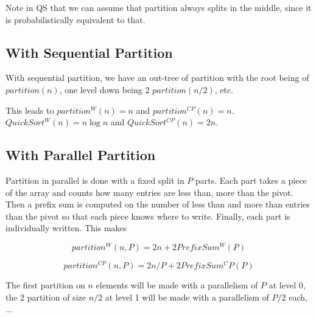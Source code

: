 \documentclass{article}
\begin{document}
Note in QS that we can assume that partition always splits in the
middle, since it is probabilistically equivalent to that.

\subsection{With Sequential Partition}

With sequential partition, we have an out-tree of partition with the
root being of $partition(n)$, one level down being 2 $partition(n/2)$,
etc.

This leads to $partition^W(n) = n$ and
$partition^{CP}(n)=n$. $QuickSort^W(n) = n \log n$ and
$QuickSort^{CP}(n) = 2n$.

\subsection{With Parallel Partition}

Partition in parallel is done with a fixed split in $P$ parts. Each
part takes a piece of the array and counts how many entries are less
than, more than the pivot. Then a prefix sum is computed on the number
of less than and more than entries than the pivot so that each piece
knows where to write. Finally, each part is individually written. This
makes

$$partition^W(n, P) = 2 n + 2 PrefixSum^W(P)$$

$$partition^{CP}(n, P) = 2 n/P + 2 PrefixSum^CP(P)$$

The first partition on $n$ elements will be made with a parallelism of
$P$ at level 0, the 2 partition of size $n/2$ at level 1 will be made with a parallelism of $P/2$ each, ...
\end{document}

